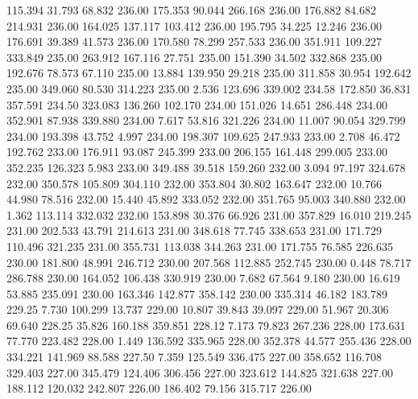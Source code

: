  115.394   31.793   68.832       236.00
 175.353   90.044  266.168       236.00
 176.882   84.682  214.931       236.00
 164.025  137.117  103.412       236.00
 195.795   34.225   12.246       236.00
 176.691   39.389   41.573       236.00
 170.580   78.299  257.533       236.00
 351.911  109.227  333.849       235.00
 263.912  167.116   27.751       235.00
 151.390   34.502  332.868       235.00
 192.676   78.573   67.110       235.00
  13.884  139.950   29.218       235.00
 311.858   30.954  192.642       235.00
 349.060   80.530  314.223       235.00
   2.536  123.696  339.002       234.58
 172.850   36.831  357.591       234.50
 323.083  136.260  102.170       234.00
 151.026   14.651  286.448       234.00
 352.901   87.938  339.880       234.00
   7.617   53.816  321.226       234.00
  11.007   90.054  329.799       234.00
 193.398   43.752    4.997       234.00
 198.307  109.625  247.933       233.00
   2.708   46.472  192.762       233.00
 176.911   93.087  245.399       233.00
 206.155  161.448  299.005       233.00
 352.235  126.323    5.983       233.00
 349.488   39.518  159.260       232.00
   3.094   97.197  324.678       232.00
 350.578  105.809  304.110       232.00
 353.804   30.802  163.647       232.00
  10.766   44.980   78.516       232.00
  15.440   45.892  333.052       232.00
 351.765   95.003  340.880       232.00
   1.362  113.114  332.032       232.00
 153.898   30.376   66.926       231.00
 357.829   16.010  219.245       231.00
 202.533   43.791  214.613       231.00
 348.618   77.745  338.653       231.00
 171.729  110.496  321.235       231.00
 355.731  113.038  344.263       231.00
 171.755   76.585  226.635       230.00
 181.800   48.991  246.712       230.00
 207.568  112.885  252.745       230.00
   0.448   78.717  286.788       230.00
 164.052  106.438  330.919       230.00
   7.682   67.564    9.180       230.00
  16.619   53.885  235.091       230.00
 163.346  142.877  358.142       230.00
 335.314   46.182  183.789       229.25
   7.730  100.299   13.737       229.00
  10.807   39.843   39.097       229.00
  51.967   20.306   69.640       228.25
  35.826  160.188  359.851       228.12
   7.173   79.823  267.236       228.00
 173.631   77.770  223.482       228.00
   1.449  136.592  335.965       228.00
 352.378   44.577  255.436       228.00
 334.221  141.969   88.588       227.50
   7.359  125.549  336.475       227.00
 358.652  116.708  329.403       227.00
 345.479  124.406  306.456       227.00
 323.612  144.825  321.638       227.00
 188.112  120.032  242.807       226.00
 186.402   79.156  315.717       226.00
